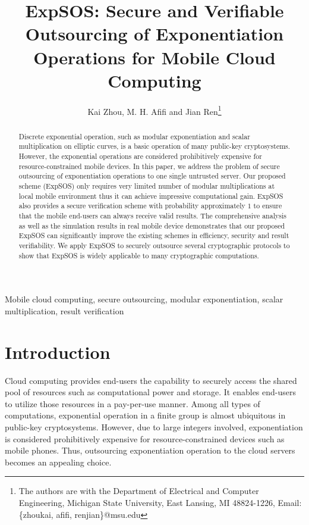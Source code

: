 \documentclass[english,draftcls,onecolumn,11pt]{IEEEtran}
\theoremstyle{definition}
\theoremstyle{plain}
\theoremstyle{plain}
\theoremstyle{definition}
\begin{document}
\title{ExpSOS: Secure and Verifiable Outsourcing of Exponentiation Operations
for Mobile Cloud Computing}


\author{Kai Zhou, M. H. Afifi and Jian Ren\thanks{The authors are with the Department of Electrical and Computer Engineering,
Michigan State University, East Lansing, MI 48824-1226, Email: \{zhoukai,
afifi, renjian\}@msu.edu}}
\maketitle
\begin{abstract}
Discrete exponential operation, such as modular exponentiation and
scalar multiplication on elliptic curves, is a basic operation of
many public-key cryptosystems. However, the exponential operations
are considered prohibitively expensive for resource-constrained mobile
devices. In this paper, we address the problem of secure outsourcing
of exponentiation operations to one single untrusted server. Our proposed
scheme (ExpSOS) only requires very limited number of modular multiplications
at local mobile environment thus it can achieve impressive computational
gain. ExpSOS also provides a secure verification scheme with probability
approximately $1$ to ensure that the mobile end-users can always
receive valid results. The comprehensive analysis as well as the simulation
results in real mobile device demonstrates that our proposed ExpSOS
can significantly improve the existing schemes in efficiency, security
and result verifiability. We apply ExpSOS to securely outsource several
cryptographic protocols to show that ExpSOS is widely applicable to
many cryptographic computations.\end{abstract}

\begin{IEEEkeywords}
Mobile cloud computing, secure outsourcing, modular exponentiation,
scalar multiplication, result verification
\end{IEEEkeywords}


\section{Introduction}

Cloud computing provides end-users the capability to securely access
the shared pool of resources such as computational power and storage.
It enables end-users to utilize those resources in a pay-per-use manner.
Among all types of computations, exponential operation in a finite
group is almost ubiquitous in public-key cryptosystems. However, due
to large integers involved, exponentiation is considered prohibitively
expensive for resource-constrained devices such as mobile phones.
Thus, outsourcing exponentiation operation to the cloud servers becomes
an appealing choice. 
\end{document}
